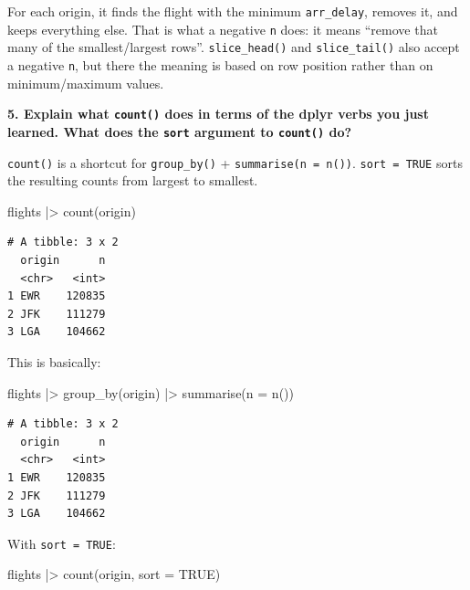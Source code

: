 \documentclass[
  letterpaper,
  DIV=11,
  numbers=noendperiod]{scrreprt}
\newenvironment{Shaded}{\begin{snugshade}}{\end{snugshade}}
\newcommand{\AttributeTok}[1]{\textcolor[rgb]{0.40,0.45,0.13}{#1}}
\newcommand{\ConstantTok}[1]{\textcolor[rgb]{0.56,0.35,0.01}{#1}}
\newcommand{\FunctionTok}[1]{\textcolor[rgb]{0.28,0.35,0.67}{#1}}
\newcommand{\NormalTok}[1]{\textcolor[rgb]{0.00,0.23,0.31}{#1}}
\newcommand{\SpecialCharTok}[1]{\textcolor[rgb]{0.37,0.37,0.37}{#1}}
\begin{document}
For each origin, it finds the flight with the minimum
\texttt{arr\_delay}, removes it, and keeps everything else. That is what
a negative \texttt{n} does: it means ``remove that many of the
smallest/largest rows''. \texttt{slice\_head()} and
\texttt{slice\_tail()} also accept a negative \texttt{n}, but there the
meaning is based on row position rather than on minimum/maximum values.

\textbf{5. Explain what \texttt{count()} does in terms of the dplyr
verbs you just learned. What does the \texttt{sort} argument to
\texttt{count()} do?}

\texttt{count()} is a shortcut for \texttt{group\_by()} +
\texttt{summarise(n\ =\ n())}. \texttt{sort\ =\ TRUE} sorts the
resulting counts from largest to smallest.

\begin{Shaded}
\begin{Highlighting}[]
\NormalTok{flights }\SpecialCharTok{|\textgreater{}}
  \FunctionTok{count}\NormalTok{(origin)}
\end{Highlighting}
\end{Shaded}

\begin{verbatim}
# A tibble: 3 x 2
  origin      n
  <chr>   <int>
1 EWR    120835
2 JFK    111279
3 LGA    104662
\end{verbatim}

This is basically:

\begin{Shaded}
\begin{Highlighting}[]
\NormalTok{flights }\SpecialCharTok{|\textgreater{}}
  \FunctionTok{group\_by}\NormalTok{(origin) }\SpecialCharTok{|\textgreater{}}
  \FunctionTok{summarise}\NormalTok{(}\AttributeTok{n =} \FunctionTok{n}\NormalTok{())}
\end{Highlighting}
\end{Shaded}

\begin{verbatim}
# A tibble: 3 x 2
  origin      n
  <chr>   <int>
1 EWR    120835
2 JFK    111279
3 LGA    104662
\end{verbatim}

With \texttt{sort\ =\ TRUE}:

\begin{Shaded}
\begin{Highlighting}[]
\NormalTok{flights }\SpecialCharTok{|\textgreater{}}
  \FunctionTok{count}\NormalTok{(origin, }\AttributeTok{sort =} \ConstantTok{TRUE}\NormalTok{)}
\end{Highlighting}
\end{Shaded}
\end{document}
